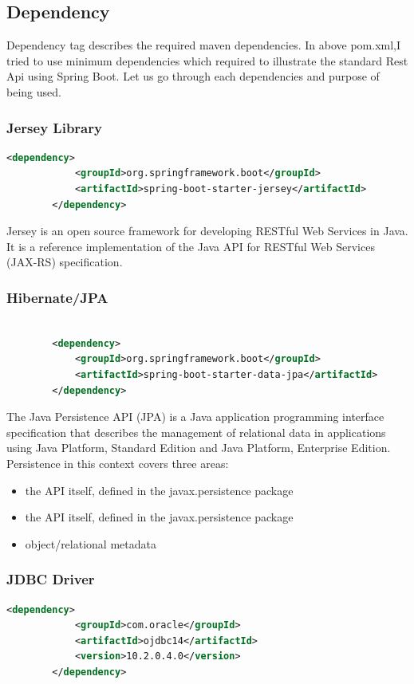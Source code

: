 \documentclass{report}
\begin{document}
	\subsection{Dependency}
	Dependency tag describes the required maven dependencies. In above pom.xml,I tried to use minimum dependencies which required to illustrate the standard Rest Api using Spring Boot. Let us go through each dependencies and purpose of being used. 
	\subsubsection{Jersey Library}
		\begin{lstlisting}[language=xml]
		<dependency>
			<groupId>org.springframework.boot</groupId>
			<artifactId>spring-boot-starter-jersey</artifactId>
		</dependency>
		\end{lstlisting}
		Jersey is an open source framework for developing RESTful Web Services in Java. It is 		a reference implementation of the Java API for RESTful Web Services (JAX-RS) specification. 
	\subsubsection{Hibernate/JPA }
		\begin{lstlisting}[language=xml]
		
		<dependency>
			<groupId>org.springframework.boot</groupId>
			<artifactId>spring-boot-starter-data-jpa</artifactId>
		</dependency>
		\end{lstlisting}
		The Java Persistence API (JPA) is a Java application programming interface 	specification that describes the management of relational data in applications using Java 	Platform, Standard Edition and Java Platform, Enterprise Edition. 	Persistence in this context 	covers three areas: 
		\begin{itemize}
			\item the API itself, defined in the javax.persistence package
			\item the API itself, defined in the javax.persistence package
			\item object/relational metadata
		\end{itemize}		
	\subsubsection{JDBC Driver}
		\begin{lstlisting}[language=xml]
		<dependency>
			<groupId>com.oracle</groupId>
			<artifactId>ojdbc14</artifactId>
			<version>10.2.0.4.0</version>
		</dependency>
		\end{lstlisting}
\end{document}
